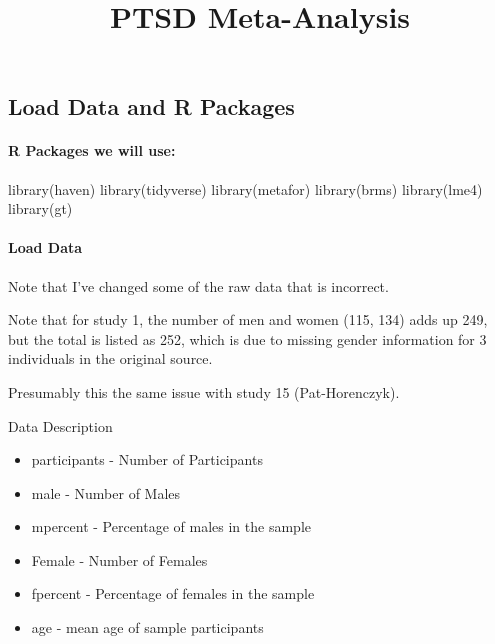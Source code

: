 \documentclass[
  letterpaper,
  DIV=11,
  numbers=noendperiod]{scrartcl}
\title{PTSD Meta-Analysis}
\author{}
\date{}
\let\oldparagraph\paragraph
\renewcommand{\paragraph}[1]{\oldparagraph{#1}\mbox{}}
\newenvironment{Shaded}{\begin{snugshade}}{\end{snugshade}}
\newcommand{\FunctionTok}[1]{\textcolor[rgb]{0.28,0.35,0.67}{#1}}
\newcommand{\NormalTok}[1]{\textcolor[rgb]{0.00,0.23,0.31}{#1}}
\renewcommand*\contentsname{Table of contents}
\newcommand\contentsname{Table of contents}
\begin{document}
\maketitle

\renewcommand*\contentsname{Table of contents}
{
\hypersetup{linkcolor=}
\setcounter{tocdepth}{3}
\tableofcontents
}
\subsection{Load Data and R Packages}\label{load-data-and-r-packages}

\paragraph{R Packages we will use:}\label{r-packages-we-will-use}

\begin{Shaded}
\begin{Highlighting}[]
\FunctionTok{library}\NormalTok{(haven)}
\FunctionTok{library}\NormalTok{(tidyverse)}
\FunctionTok{library}\NormalTok{(metafor)}
\FunctionTok{library}\NormalTok{(brms)}
\FunctionTok{library}\NormalTok{(lme4)}
\FunctionTok{library}\NormalTok{(gt)}
\end{Highlighting}
\end{Shaded}

\paragraph{Load Data}\label{load-data}

Note that I've changed some of the raw data that is incorrect.

Note that for study 1, the number of men and women (115, 134) adds up
249, but the total is listed as 252, which is due to missing gender
information for 3 individuals in the original source.

Presumably this the same issue with study 15 (Pat-Horenczyk).

Data Description

\begin{itemize}
\item
  participants - Number of Participants
\item
  male - Number of Males
\item
  mpercent - Percentage of males in the sample
\item
  Female - Number of Females
\item
  fpercent - Percentage of females in the sample
\item
  age - mean age of sample participants
\end{itemize}
\end{document}
